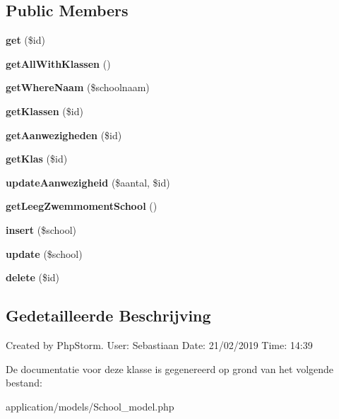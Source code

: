 \subsection*{Public Members}
\begin{DoxyCompactItemize}
\item 
\mbox{\label{class_school__model_a50e3bfb586b2f42932a6a93f3fbb0828}} 
{\bfseries get} (\$id)
\item 
\mbox{\label{class_school__model_a2041768ed04d99dfc619e3a61dda054b}} 
{\bfseries get\+All\+With\+Klassen} ()
\item 
\mbox{\label{class_school__model_a38d34fb20fa289a2706bd3d6f536ccaf}} 
{\bfseries get\+Where\+Naam} (\$schoolnaam)
\item 
\mbox{\label{class_school__model_a0287f4a9a70465b7a3ef6f28a6c15bad}} 
{\bfseries get\+Klassen} (\$id)
\item 
\mbox{\label{class_school__model_a8323c65e9e87026467a10e6d0c0b9cd4}} 
{\bfseries get\+Aanwezigheden} (\$id)
\item 
\mbox{\label{class_school__model_acbe5ed68e57a3606d60f9ed5cb2d6ed5}} 
{\bfseries get\+Klas} (\$id)
\item 
\mbox{\label{class_school__model_abe6cf9cd6c70a1f4cc221a358bef096e}} 
{\bfseries update\+Aanwezigheid} (\$aantal, \$id)
\item 
\mbox{\label{class_school__model_ae18636637959cfd51cb65cf57dbfc62c}} 
{\bfseries get\+Leeg\+Zwemmoment\+School} ()
\item 
\mbox{\label{class_school__model_a67d5cf0361b200844b978390638daa32}} 
{\bfseries insert} (\$school)
\item 
\mbox{\label{class_school__model_a149f71229b8f7a29141bad8e8158aa39}} 
{\bfseries update} (\$school)
\item 
\mbox{\label{class_school__model_a2f8258add505482d7f00ea26493a5723}} 
{\bfseries delete} (\$id)
\end{DoxyCompactItemize}


\subsection{Gedetailleerde Beschrijving}
Created by Php\+Storm. User\+: Sebastiaan Date\+: 21/02/2019 Time\+: 14\+:39 

De documentatie voor deze klasse is gegenereerd op grond van het volgende bestand\+:\begin{DoxyCompactItemize}
\item 
application/models/School\+\_\+model.\+php\end{DoxyCompactItemize}
